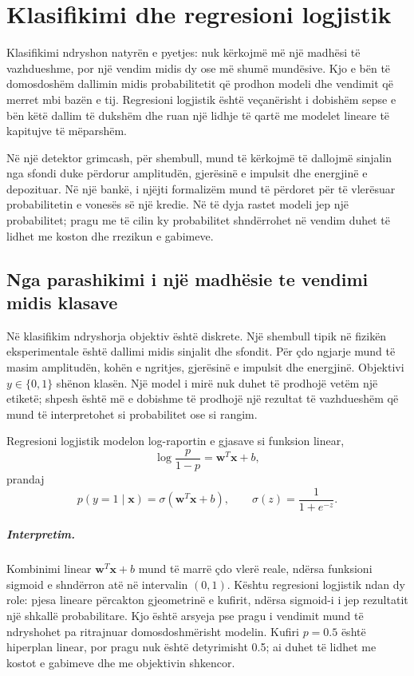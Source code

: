 \documentclass[12pt,a4paper,oneside]{book}
\begin{document}
\chapter[Klasifikimi logjistik]{Klasifikimi dhe regresioni logjistik}

Klasifikimi ndryshon natyrën e pyetjes: nuk kërkojmë më një madhësi të vazhdueshme, por një vendim midis dy ose më shumë mundësive. Kjo e bën të domosdoshëm dallimin midis probabilitetit që prodhon modeli dhe vendimit që merret mbi bazën e tij. Regresioni logjistik është veçanërisht i dobishëm sepse e bën këtë dallim të dukshëm dhe ruan një lidhje të qartë me modelet lineare të kapitujve të mëparshëm.

Në një detektor grimcash, për shembull, mund të kërkojmë të dallojmë sinjalin nga sfondi duke përdorur amplitudën, gjerësinë e impulsit dhe energjinë e depozituar. Në një bankë, i njëjti formalizëm mund të përdoret për të vlerësuar probabilitetin e vonesës së një kredie. Në të dyja rastet modeli jep një probabilitet; pragu me të cilin ky probabilitet shndërrohet në vendim duhet të lidhet me koston dhe rrezikun e gabimeve.
\section{Nga parashikimi i një madhësie te vendimi midis klasave}

Në klasifikim ndryshorja objektiv është diskrete. Një shembull tipik në fizikën eksperimentale është dallimi midis sinjalit dhe sfondit. Për çdo ngjarje mund të masim amplitudën, kohën e ngritjes, gjerësinë e impulsit dhe energjinë. Objektivi $y\in\{0,1\}$ shënon klasën. Një model i mirë nuk duhet të prodhojë vetëm një etiketë; shpesh është më e dobishme të prodhojë një rezultat të vazhdueshëm që mund të interpretohet si probabilitet ose si rangim.

Regresioni logjistik modelon log-raportin e gjasave si funksion linear,
\[
\log\frac{p}{1-p}=\mathbf w^T\mathbf x+b,
\]
prandaj
\[
p(y=1\mid\mathbf x)=\sigma(\mathbf w^T\mathbf x+b),\qquad \sigma(z)=\frac{1}{1+e^{-z}}.
\]

\paragraph{Interpretim.}
Kombinimi linear $\mathbf w^T\mathbf x+b$ mund të marrë çdo vlerë reale, ndërsa funksioni sigmoid e shndërron atë në intervalin $(0,1)$. Kështu regresioni logjistik ndan dy role: pjesa lineare përcakton gjeometrinë e kufirit, ndërsa sigmoid-i i jep rezultatit një shkallë probabilitare. Kjo është arsyeja pse pragu i vendimit mund të ndryshohet pa ritrajnuar domosdoshmërisht modelin.
Kufiri $p=0.5$ është hiperplan linear, por pragu nuk është detyrimisht 0.5; ai duhet të lidhet me kostot e gabimeve dhe me objektivin shkencor.
\end{document}
